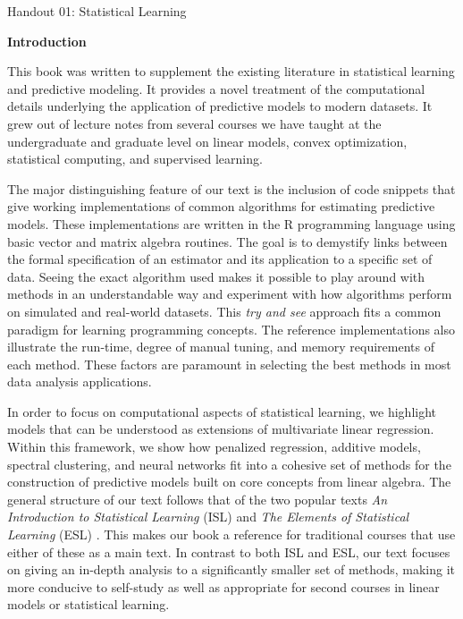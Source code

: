 \documentclass[12pt,hidelinks]{article}
\numberwithin{equation}{section}
\begin{document}
{\LARGE Handout 01: Statistical Learning}

\vspace*{18pt}

\textbf{Introduction}

This book was written to supplement the existing literature in statistical
learning and predictive modeling. It provides a novel treatment of
the computational details underlying the application of predictive models to
modern datasets. It grew out of lecture notes from several courses we have
taught at the undergraduate and graduate level on linear models, convex
optimization, statistical computing, and supervised learning.

The major distinguishing feature of our text is the inclusion of code snippets
that give working implementations of common algorithms for
estimating predictive models. These implementations are written in the R
programming language using basic vector and matrix algebra routines. The goal
is to demystify links between the formal specification of an estimator and
its application to a specific set of data. Seeing the
exact algorithm used makes it possible to play around
with methods in an understandable way and experiment with how
algorithms perform on simulated and real-world datasets. This \textit{try and
see} approach fits a common paradigm for learning programming concepts.
The reference implementations also illustrate the run-time,
degree of manual tuning, and memory requirements of each method.
These factors are paramount in selecting the best methods in most
data analysis applications.

In order to focus on computational aspects of statistical learning,
we highlight models that can be understood as extensions
of multivariate linear regression. Within this framework, we show
how penalized regression, additive models, spectral clustering,
and neural networks fit into a cohesive set of methods for
the construction of predictive models built on core concepts from
linear algebra. The general structure
of our text follows that of the two popular texts \textit{An Introduction
to Statistical Learning} (ISL) \cite{james2013introduction} and
\textit{The Elements of Statistical Learning} (ESL)
\cite{friedman2001elements}. This makes our book a reference for
traditional courses that use either of these as a main text. In contrast
to both ISL and ESL, our text focuses on giving an in-depth analysis
to a significantly smaller set of methods, making it more conducive
to self-study as well as appropriate for second courses in linear models
or statistical learning.
\end{document}
